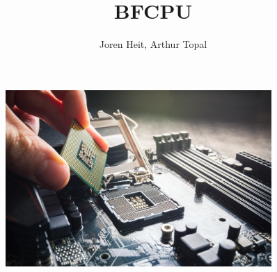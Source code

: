 \documentclass{article}
\title{BFCPU}
\author{ Joren Heit, Arthur Topal }
\date{}
\begin{document}
\maketitle
\thispagestyle{empty}

\begin{figure}[H]
	\centering
	\includegraphics[width=0.9\textwidth]{img/_processor}
\end{figure}

\newpage
\tableofcontents
















\end{document}
